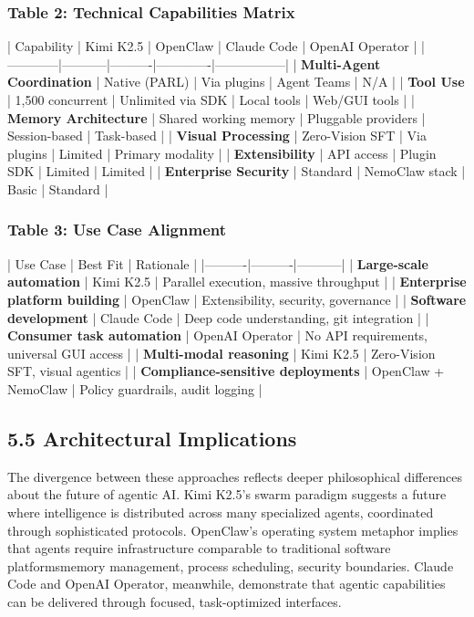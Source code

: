 \subsubsection{Table 2: Technical Capabilities Matrix}

| Capability | Kimi K2.5 | OpenClaw | Claude Code | OpenAI Operator |
|------------|-----------|----------|-------------|-----------------|
| \textbf{Multi-Agent Coordination} | Native (PARL) | Via plugins | Agent Teams | N/A |
| \textbf{Tool Use} | 1,500 concurrent | Unlimited via SDK | Local tools | Web/GUI tools |
| \textbf{Memory Architecture} | Shared working memory | Pluggable providers | Session-based | Task-based |
| \textbf{Visual Processing} | Zero-Vision SFT | Via plugins | Limited | Primary modality |
| \textbf{Extensibility} | API access | Plugin SDK | Limited | Limited |
| \textbf{Enterprise Security} | Standard | NemoClaw stack | Basic | Standard |

\subsubsection{Table 3: Use Case Alignment}

| Use Case | Best Fit | Rationale |
|----------|----------|-----------|
| \textbf{Large-scale automation} | Kimi K2.5 | Parallel execution, massive throughput |
| \textbf{Enterprise platform building} | OpenClaw | Extensibility, security, governance |
| \textbf{Software development} | Claude Code | Deep code understanding, git integration |
| \textbf{Consumer task automation} | OpenAI Operator | No API requirements, universal GUI access |
| \textbf{Multi-modal reasoning} | Kimi K2.5 | Zero-Vision SFT, visual agentics |
| \textbf{Compliance-sensitive deployments} | OpenClaw + NemoClaw | Policy guardrails, audit logging |

\subsection{5.5 Architectural Implications}

The divergence between these approaches reflects deeper philosophical differences about the future of agentic AI. Kimi K2.5's swarm paradigm suggests a future where intelligence is distributed across many specialized agents, coordinated through sophisticated protocols. OpenClaw's operating system metaphor implies that agents require infrastructure comparable to traditional software platformsmemory management, process scheduling, security boundaries. Claude Code and OpenAI Operator, meanwhile, demonstrate that agentic capabilities can be delivered through focused, task-optimized interfaces.

